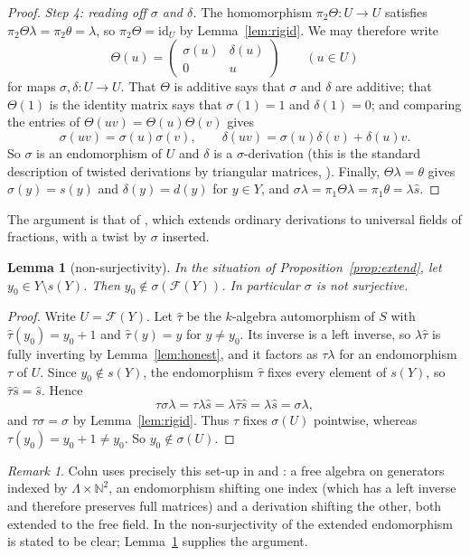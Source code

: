 \documentclass[11pt]{amsart}
\theoremstyle{plain}
\newtheorem{lemma}[theorem]{Lemma}
\theoremstyle{definition}
\theoremstyle{remark}
\newtheorem{remark}[theorem]{Remark}
\newcommand{\N}{\mathbb N}
\newcommand{\ff}[1]{\mathcal F(#1)}
\newcommand{\id}{\mathrm{id}}
\begin{document}
\begin{proof}
\emph{Step 4: reading off $\sigma$ and $\delta$.} The homomorphism $\pi_2\Theta\colon U\to U$ satisfies $\pi_2\Theta\lambda=\pi_2\theta=\lambda$, so $\pi_2\Theta=\id_U$ by Lemma~\ref{lem:rigid}. We may therefore write
\[
\Theta(u)=\begin{pmatrix}\sigma(u)&\delta(u)\\0&u\end{pmatrix}\qquad(u\in U)
\]
for maps $\sigma,\delta\colon U\to U$. That $\Theta$ is additive says that $\sigma$ and $\delta$ are additive; that $\Theta(1)$ is the identity matrix says that $\sigma(1)=1$ and $\delta(1)=0$; and comparing the entries of $\Theta(uv)=\Theta(u)\Theta(v)$ gives
\[
\sigma(uv)=\sigma(u)\sigma(v),\qquad\delta(uv)=\sigma(u)\delta(v)+\delta(u)v .
\]
So $\sigma$ is an endomorphism of $U$ and $\delta$ is a $\sigma$-derivation (this is the standard description of twisted derivations by triangular matrices, \cite[\S2.1]{CohSF}). Finally, $\Theta\lambda=\theta$ gives $\sigma(y)=s(y)$ and $\delta(y)=d(y)$ for $y\in Y$, and $\sigma\lambda=\pi_1\Theta\lambda=\pi_1\theta=\lambda\hat s$.
\end{proof}

The argument is that of \cite[Theorem~7.5.17]{CohFIR}, which extends ordinary derivations to universal fields of fractions, with a twist by $\sigma$ inserted.

\begin{lemma}[non-surjectivity]\label{lem:nonsurj}
In the situation of Proposition~\ref{prop:extend}, let $y_0\in Y\setminus s(Y)$. Then $y_0\notin\sigma(\ff Y)$. In particular $\sigma$ is not surjective.
\end{lemma}

\begin{proof}
Write $U=\ff Y$. Let $\hat\tau$ be the $k$-algebra automorphism of $S$ with $\hat\tau(y_0)=y_0+1$ and $\hat\tau(y)=y$ for $y\ne y_0$. Its inverse is a left inverse, so $\lambda\hat\tau$ is fully inverting by Lemma~\ref{lem:honest}, and it factors as $\tau\lambda$ for an endomorphism $\tau$ of $U$. Since $y_0\notin s(Y)$, the endomorphism $\hat\tau$ fixes every element of $s(Y)$, so $\hat\tau\hat s=\hat s$. Hence
\[
\tau\sigma\lambda=\tau\lambda\hat s=\lambda\hat\tau\hat s=\lambda\hat s=\sigma\lambda,
\]
and $\tau\sigma=\sigma$ by Lemma~\ref{lem:rigid}. Thus $\tau$ fixes $\sigma(U)$ pointwise, whereas $\tau(y_0)=y_0+1\ne y_0$. So $y_0\notin\sigma(U)$.
\end{proof}

\begin{remark}
Cohn uses precisely this set-up in \cite[\S5]{Coh77} and \cite[\S5.9]{CohSF}: a free algebra on generators indexed by $\Lambda\times\N^2$, an endomorphism shifting one index (which has a left inverse and therefore preserves full matrices) and a derivation shifting the other, both extended to the free field. In \cite{Coh77} the non-surjectivity of the extended endomorphism is stated to be clear; Lemma~\ref{lem:nonsurj} supplies the argument.
\end{remark}
\end{document}
